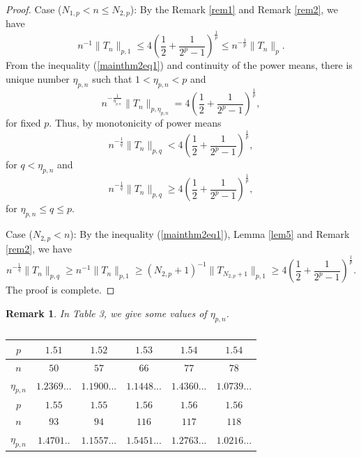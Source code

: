 \documentclass{amsart}
\newtheorem{remark}{Remark}
\begin{document}
\begin{proof}
Case ($N_{1,p}<n\leq N_{2, p}$): By the Remark \ref{rem1} and Remark \ref{rem2}, we have
$$n^{-1}\|T_{n}\|_{p,1}\leq 4\left(\frac{1}{2}+\frac{1}{2^p-1}\right)^{\frac{1}{p}}\leq n^{-\frac{1}{p}}\|T_{n}\|_{p}.$$
From the inequality (\ref{mainthm2eq1}) and continuity of the power means, there is unique number $\eta_{p,n}$ such that $1<\eta_{p,n}<p$ and 
$$n^{-\frac{1}{\eta_{p,n}}}\|T_{n}\|_{p,\eta_{p,n}}= 4\left(\frac{1}{2}+\frac{1}{2^p-1}\right)^{\frac{1}{p}},$$
for fixed $p$. Thus, by monotonicity of power means
$$n^{-\frac{1}{q}}\|T_{n}\|_{p,q}<4\left(\frac{1}{2}+\frac{1}{2^p-1}\right)^{\frac{1}{p}},$$
for $q<\eta_{p,n}$ and
$$n^{-\frac{1}{q}}\|T_{n}\|_{p,q}\geq4\left(\frac{1}{2}+\frac{1}{2^p-1}\right)^{\frac{1}{p}},$$
for $\eta_{p,n}\leq q\leq p$.

Case ($N_{2, p}<n$): By the inequality (\ref{mainthm2eq1}), Lemma \ref{lem5} and Remark \ref{rem2}, we have
$$n^{-\frac{1}{q}}\|T_{n}\|_{p,q}\geq n^{-1}\|T_n\|_{p,1}\geq (N_{2,p}+1)^{-1}\|T_{N_{2,p}+1}\|_{p,1}\geq4\left(\frac{1}{2}+\frac{1}{2^p-1}\right)^{\frac{1}{p}}.$$
The proof is complete.
\end{proof}
\begin{remark}
    In Table 3, we give some values of $\eta_{p, n}$.
\begin{table}[ht!]
\centering
\begin{tabular}{ |c|c|c|c|c|c| } 
\hline
$p$ & $1.51$ & $1.52$ & $1.53$ & $1.54$ & $1.54$ \\
\hline
$n$ & $50$ & $57$ & $66$ & $77$ & $78$ \\
\hline
$\eta_{p, n}$& $1.2369...$ & $1.1900...$ & $1.1448...$ & $1.4360...$ & $1.0739...$ \\
\hline\hline
$p$ &  $1.55$ & $1.55$ & $1.56$ & $1.56$ & $1.56$\\
\hline
$n$  & $93$ & $94$ & $116$ & $117$ & $118$ \\
\hline
$\eta_{p, n}$ & $1.4701..$ & $1.1557...$ & $1.5451...$ & $1.2763...$ & $1.0216...$ \\
\hline
\end{tabular}
\caption{}
\label{table:3}
\end{table}
\end{remark}
\end{document}
